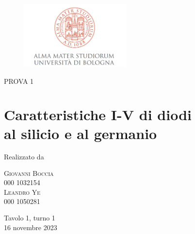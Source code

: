 \thispagestyle{empty} %

\begin{figure}[h]
    \centering
    \includegraphics[width=0.5\textwidth]{image/logo.png}
    \label{Logo}
\end{figure}

\vspace{0.5cm}

\begin{center}
{\large \textsc{PROVA 1}}
\end{center}

\section*{\centering \Huge \bf Caratteristiche I-V di diodi\\al silicio e al germanio}

\vspace{3cm}

\begin{center}
{\large Realizzato da} \\
\vspace{2cm}

\begin{multicols}{2}
    \Large\textsc{Giovanni Boccia}\\ 000 1032154\\
    \Large\textsc{Leandro Ye}\\ 000 1050281\\
\end{multicols}
 
\end{center}

\vspace{3cm}

\begin{center}
{\large Tavolo 1, turno 1}\\
\vspace{1cm}
{\large 16 novembre 2023}
\end{center}

\newpage